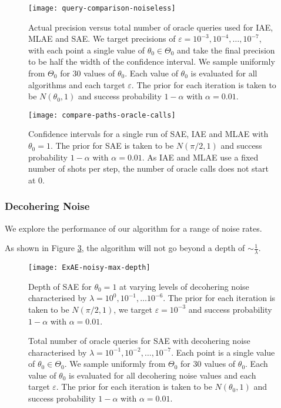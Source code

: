 \begin{figure}[htbp]
	\centering
	\texttt{[image: query-comparison-noiseless]}
	\caption{Actual precision versus total number of oracle queries used for IAE, MLAE and SAE. We target precisions of $\varepsilon = 10^{-3}, 10^{-4}, \ldots , 10^{-7}$, with each point a single value of $\theta_0 \in \Theta_0$ and take the final precision to be half the width of the confidence interval. We sample uniformly from $\Theta_0$ for 30 values of $\theta_0$. Each value of $\theta_0$ is evaluated for all algorithms and each target $\varepsilon$. The prior for each iteration is taken to be $N(\theta_0, 1)$ and success probability $1 - \alpha$ with $\alpha = 0.01$.}
	\label{fig::query-comparison-noiseless}
\end{figure}


\begin{figure}[htbp]
	\centering
	\texttt{[image: compare-paths-oracle-calls]}
	\caption{Confidence intervals for a single run of SAE, IAE and MLAE with $\theta_0 = 1$. The prior for SAE is taken to be $N(\pi/2, 1)$ and success probability $1 - \alpha$ with $\alpha = 0.01$. As IAE and MLAE use a fixed number of shots per step, the number of oracle calls does not start at 0.}
	\label{fig::compare-paths-oracle-calls}
\end{figure}

\subsubsection{Decohering Noise}
We explore the performance of our algorithm for a range of noise rates.

As shown in Figure \ref{fig::ExAE-noisy-max-depth}, the algorithm will not go beyond a depth of $\sim \frac{1}{\lambda}$.

\begin{figure}[htbp]
	\centering
	\texttt{[image: ExAE-noisy-max-depth]}
	\caption{Depth of SAE for $\theta_0 = 1$ at varying levels of decohering noise characterised by $\lambda = 10^0, 10^{-1}, \ldots 10^{-6}$. The prior for each iteration is taken to be $N(\pi /2, 1)$, we target $\varepsilon = 10^{-3}$ and success probability $1 - \alpha$ with $\alpha = 0.01$.}
	\label{fig::ExAE-noisy-max-depth}
\end{figure}

\begin{figure}[htbp]
	\centering
	\caption{Total number of oracle queries for SAE with decohering noise characterised by $\lambda = 10^{-1}, 10^{-2}, \ldots, 10^{-7}$. Each point is a single value of $\theta_0 \in \Theta_0$. We sample uniformly from $\Theta_0$ for 30 values of $\theta_0$. Each value of $\theta_0$ is evaluated for all decohering noise values and each target $\varepsilon$. The prior for each iteration is taken to be $N(\theta_0, 1)$ and success probability $1 - \alpha$ with $\alpha = 0.01$.}
	\label{fig::query-exae-noisy}
\end{figure}

